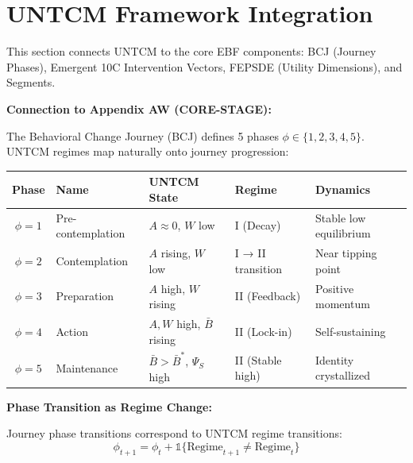 
\section{UNTCM Framework Integration}
\label{sec:untcm-integration}

This section connects UNTCM to the core EBF components: BCJ (Journey Phases), Emergent 10C Intervention Vectors, FEPSDE (Utility Dimensions), and Segments.

\begin{tcolorbox}[colback=blue!5!white, colframe=blue!75!black,
    title=\textbf{Integration UNTCM-I1: BCJ Journey Phase Mapping}]

\textbf{Connection to Appendix AW (CORE-STAGE):}

The Behavioral Change Journey (BCJ) defines 5 phases $\phi \in \{1, 2, 3, 4, 5\}$. UNTCM regimes map naturally onto journey progression:

\begin{center}
\renewcommand{\arraystretch}{1.3}
\begin{tabular}{@{}cllll@{}}
\toprule
\textbf{Phase} & \textbf{Name} & \textbf{UNTCM State} & \textbf{Regime} & \textbf{Dynamics} \\
\midrule
$\phi = 1$ & Pre-contemplation & $A \approx 0$, $W$ low & I (Decay) & Stable low equilibrium \\
$\phi = 2$ & Contemplation & $A$ rising, $W$ low & I → II transition & Near tipping point \\
$\phi = 3$ & Preparation & $A$ high, $W$ rising & II (Feedback) & Positive momentum \\
$\phi = 4$ & Action & $A, W$ high, $\bar{B}$ rising & II (Lock-in) & Self-sustaining \\
$\phi = 5$ & Maintenance & $\bar{B} > \bar{B}^*$, $\Psi_S$ high & II (Stable high) & Identity crystallized \\
\bottomrule
\end{tabular}
\end{center}

\textbf{Phase Transition as Regime Change:}

Journey phase transitions correspond to UNTCM regime transitions:
\begin{equation}
\phi_{t+1} = \phi_t + \mathbb{1}\{\text{Regime}_{t+1} \neq \text{Regime}_t\}
\end{equation}


\end{tcolorbox}

